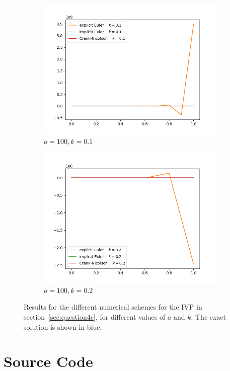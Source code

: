 \documentclass{article}
\begin{document}
\begin{figure}
\begin{subfigure}[b]{.49\linewidth}
      \includegraphics[scale=.4]{4c-ivp-a100-k0-1.png}
      \caption{$a=100, k=0.1$}
  \end{subfigure}
  \begin{subfigure}[b]{.49\linewidth}
      \includegraphics[scale=.4]{4c-ivp-a100-k0-2.png}
      \caption{$a=100, k=0.2$}
  \end{subfigure}

  \caption{Results for the different numerical schemes for the IVP in section~\ref{sec:question4c},
    for different values of $a$ and $k$.
    The exact solution is shown in blue. \label{fig:4c-ivp}}
\end{figure}

\appendix
\section{Source Code}

\end{document}
